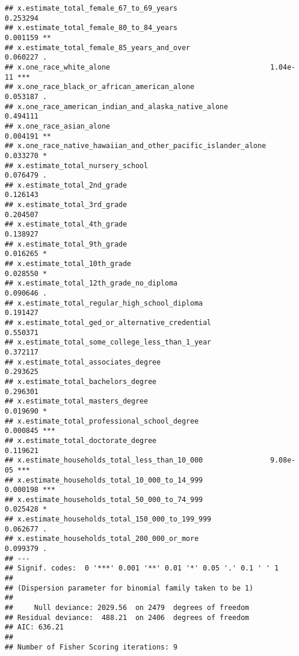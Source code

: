 \documentclass[
]{article}
\begin{document}
\begin{verbatim}
## x.estimate_total_female_67_to_69_years                      0.253294    
## x.estimate_total_female_80_to_84_years                      0.001159 ** 
## x.estimate_total_female_85_years_and_over                   0.060227 .  
## x.one_race_white_alone                                      1.04e-11 ***
## x.one_race_black_or_african_american_alone                  0.053187 .  
## x.one_race_american_indian_and_alaska_native_alone          0.494111    
## x.one_race_asian_alone                                      0.004191 ** 
## x.one_race_native_hawaiian_and_other_pacific_islander_alone 0.033270 *  
## x.estimate_total_nursery_school                             0.076479 .  
## x.estimate_total_2nd_grade                                  0.126143    
## x.estimate_total_3rd_grade                                  0.204507    
## x.estimate_total_4th_grade                                  0.138927    
## x.estimate_total_9th_grade                                  0.016265 *  
## x.estimate_total_10th_grade                                 0.028550 *  
## x.estimate_total_12th_grade_no_diploma                      0.090646 .  
## x.estimate_total_regular_high_school_diploma                0.191427    
## x.estimate_total_ged_or_alternative_credential              0.550371    
## x.estimate_total_some_college_less_than_1_year              0.372117    
## x.estimate_total_associates_degree                          0.293625    
## x.estimate_total_bachelors_degree                           0.296301    
## x.estimate_total_masters_degree                             0.019690 *  
## x.estimate_total_professional_school_degree                 0.000845 ***
## x.estimate_total_doctorate_degree                           0.119621    
## x.estimate_households_total_less_than_10_000                9.08e-05 ***
## x.estimate_households_total_10_000_to_14_999                0.000198 ***
## x.estimate_households_total_50_000_to_74_999                0.025428 *  
## x.estimate_households_total_150_000_to_199_999              0.062677 .  
## x.estimate_households_total_200_000_or_more                 0.099379 .  
## ---
## Signif. codes:  0 '***' 0.001 '**' 0.01 '*' 0.05 '.' 0.1 ' ' 1
## 
## (Dispersion parameter for binomial family taken to be 1)
## 
##     Null deviance: 2029.56  on 2479  degrees of freedom
## Residual deviance:  488.21  on 2406  degrees of freedom
## AIC: 636.21
## 
## Number of Fisher Scoring iterations: 9
\end{verbatim}
\end{document}
